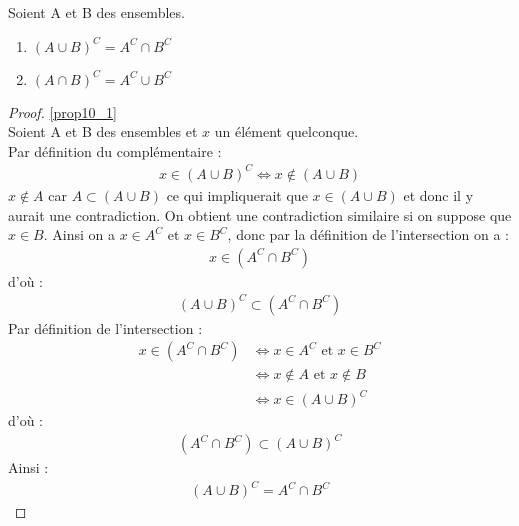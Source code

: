 \begin{proposition} Soient A et B des ensembles.
	\begin{enumerate}
		\item \label{prop10_1} $(A \cup B)^C = A^C \cap B^C$
		\item \label{prop10_2} $(A \cap B)^C = A^C \cup B^C$
	\end{enumerate}
\end{proposition}

\begin{proof}
	\ref{prop10_1} \\
	Soient A et B des ensembles et $x$ un élément quelconque.
	\\
	\framebox{$\subset$}
	Par définition du complémentaire : 
	\begin{align*}
		x \in (A \cup B)^C \iff x \notin (A \cup B)
	\end{align*}
	$x \notin A$ car $A \subset (A \cup B)$ ce qui impliquerait que $x \in (A \cup B)$ et donc il y aurait une contradiction. On obtient une contradiction similaire si on suppose que $x \in B$. Ainsi on a $x \in A^C \text{ et } x \in B^C$, donc par la définition de l'intersection on a :
	\begin{align*}
		x \in (A^C \cap B^C)
	\end{align*}
	d'où :
	\begin{align*}
		(A \cup B)^C \subset (A^C \cap B^C)
	\end{align*}
	\framebox{$\supset$} Par définition de l'intersection :
	\begin{align*}
		x \in (A^C \cap B^C) &\iff x \in A^C \text{ et } x \in B^C \\
		&\iff x \notin A \text{ et } x \notin B \\
		&\iff x \in (A \cup B)^C
	\end{align*}
	d'où :
	\begin{align*}
		(A^C \cap B^C) \subset (A \cup B)^C
	\end{align*}
	Ainsi : 
	\begin{align*}
		(A \cup B)^C = A^C \cap B^C
	\end{align*}
\end{proof}


